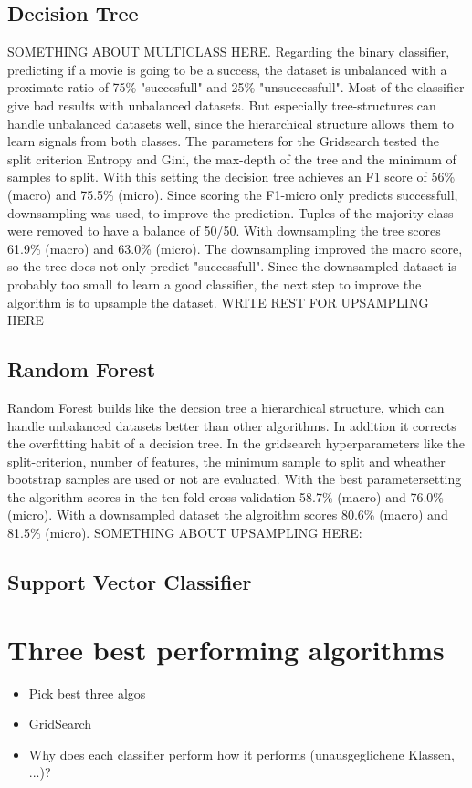\subsection{Decision Tree}
SOMETHING ABOUT MULTICLASS HERE.
Regarding the binary classifier, predicting if a movie is going to be a success, the dataset is unbalanced with a proximate ratio of 75\% "succesfull" and 25\% "unsuccessfull". Most of the classifier give bad results with unbalanced datasets. But especially tree-structures can handle unbalanced datasets well, since the hierarchical structure allows them to learn signals from both classes.
The parameters for the Gridsearch tested the split criterion Entropy and Gini, the max-depth of the tree and the minimum of samples to split. 
With this setting the decision tree achieves an F1 score of 56\% (macro) and 75.5\% (micro).
Since scoring the F1-micro only predicts successfull, downsampling was used, to improve the prediction. Tuples of the majority class were removed to have a balance of 50/50.
With downsampling the tree scores 61.9\% (macro) and 63.0\% (micro). The downsampling improved the macro score, so the tree does not only predict "successfull". Since the downsampled dataset is probably too small to learn a good classifier, the next step to improve the algorithm is to upsample the dataset. WRITE REST FOR UPSAMPLING HERE

\subsection{Random Forest}
Random Forest builds like the decsion tree a hierarchical structure, which can handle unbalanced datasets better than other algorithms. In addition it corrects the overfitting habit of a decision tree. In the gridsearch hyperparameters like the split-criterion, number of features, the minimum sample to split and wheather bootstrap samples are used or not are evaluated.
With the best parametersetting the algorithm scores in the ten-fold cross-validation 58.7\% (macro) and 76.0\% (micro).
With a downsampled dataset the algroithm scores 80.6\% (macro) and 81.5\% (micro).
SOMETHING ABOUT UPSAMPLING HERE:

\subsection{Support Vector Classifier}

\section{Three best performing algorithms}
\begin{itemize}
	\item Pick best three algos
	\item GridSearch
	\item Why does each classifier perform how it performs (unausgeglichene Klassen, ...)?
\end{itemize}
